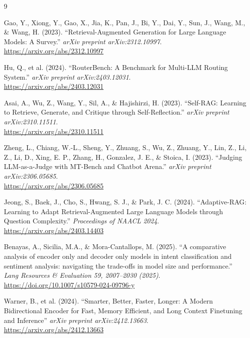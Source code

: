 \documentclass[11pt, a4paper]{article}
\begin{document}
\begin{thebibliography}{9}

Gao, Y., Xiong, Y., Gao, X., Jia, K., Pan, J., Bi, Y., Dai, Y., Sun, J., Wang, M., \& Wang, H. (2023).
``Retrieval-Augmented Generation for Large Language Models: A Survey.''
\textit{arXiv preprint arXiv:2312.10997}. \\
\url{https://arxiv.org/abs/2312.10997}

Hu, Q., et al. (2024). 
``RouterBench: A Benchmark for Multi-LLM Routing System.'' 
\textit{arXiv preprint arXiv:2403.12031}. \\
\url{https://arxiv.org/abs/2403.12031}

Asai, A., Wu, Z., Wang, Y., Sil, A., \& Hajishirzi, H. (2023).
``Self-RAG: Learning to Retrieve, Generate, and Critique through Self-Reflection.''
\textit{arXiv preprint arXiv:2310.11511}. \\
\url{https://arxiv.org/abs/2310.11511}

Zheng, L., Chiang, W.-L., Sheng, Y., Zhuang, S., Wu, Z., Zhuang, Y., Lin, Z., Li, Z., Li, D., Xing, E. P., Zhang, H., Gonzalez, J. E., \& Stoica, I. (2023).
``Judging LLM-as-a-Judge with MT-Bench and Chatbot Arena.''
\textit{arXiv preprint arXiv:2306.05685}. \\
\url{https://arxiv.org/abs/2306.05685}

Jeong, S., Baek, J., Cho, S., Hwang, S. J., \& Park, J. C. (2024). 
``Adaptive-RAG: Learning to Adapt Retrieval-Augmented Large Language Models through Question Complexity.'' 
\textit{Proceedings of NAACL 2024}. \\
\url{https://arxiv.org/abs/2403.14403}

Benayas, A., Sicilia, M.A., \& Mora-Cantallops, M. (2025).
``A comparative analysis of encoder only and decoder only models in intent classification and sentiment analysis: navigating the trade-offs in model size and performance.''
\textit{Lang Resources \& Evaluation 59, 2007--2030 (2025)}. \\
\url{https://doi.org/10.1007/s10579-024-09796-y}

Warner, B., et al. (2024). 
``Smarter, Better, Faster, Longer: A Modern Bidirectional Encoder for Fast, Memory Efficient, and Long Context Finetuning and Inference'' 
\textit{arXiv preprint arXiv:2412.13663}. \\
\url{https://arxiv.org/abs/2412.13663}


\end{thebibliography}
\end{document}
